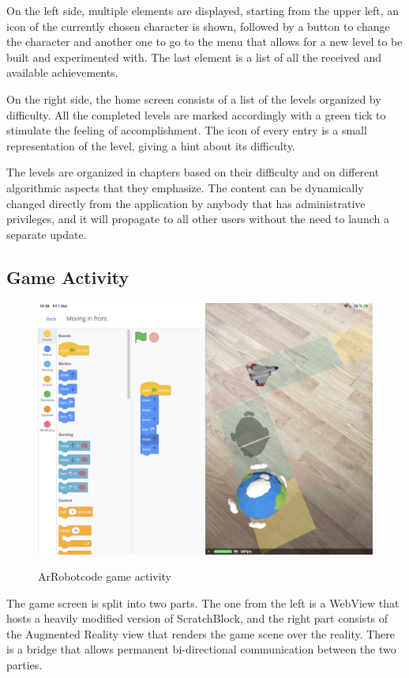\documentclass[12 pct]{report}
\begin{document}
On the left side, multiple elements are displayed, starting from the upper left, an icon of the currently chosen character is shown, followed by a button to change the character and another one to go to the menu that allows for a new level to be built and experimented with. The last element is a list of all the received and available achievements.

On the right side, the home screen consists of a list of the levels organized by difficulty. All the completed levels are marked accordingly with a green tick to stimulate the feeling of accomplishment. The icon of every entry is a small representation of the level, giving a hint about its difficulty. 

The levels are organized in chapters based on their difficulty and on different algorithmic aspects that they emphasize. The content can be dynamically changed directly from the application by anybody that has administrative privileges, and it will propagate to all other users without the need to launch a separate update.


\subsection*{Game Activity}
\begin{figure}[H]
\includegraphics[width=1.0\textwidth]{ArRobotCode2}
\centering
\label{fig:hololens}
\caption{ArRobotcode game activity}
\end{figure}
The game screen is split into two parts. The one from the left is a WebView \cite{hazarika2014recommendations} that hosts a heavily modified version of ScratchBlock, and the right part consists of the Augmented Reality view that renders the game scene over the reality. There is a bridge that allows permanent bi-directional communication between the two parties.
\end{document}
